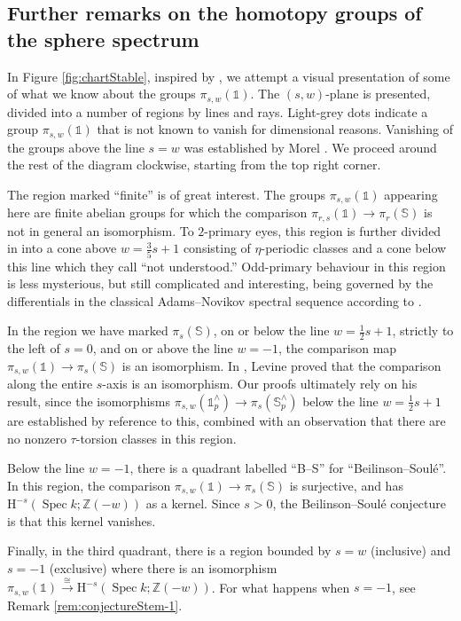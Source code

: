 \documentclass[11pt, oneside, dvipsnames, svgnames, table, final]{amsart}
\newcommand{\mathbx}[1]{\mathbb{#1}}
\theoremstyle{plain}
\theoremstyle{definition}
\theoremstyle{remark}
\newcommand{\Z}{\mathbx{Z}}
\newcommand{\spec}{\operatorname{Spec}}
\newcommand{\Spec}{\spec}
\newcommand{\Hoh}{\mathrm{H}}
\newcommand{\isom}{\cong}
\newcommand{\mto}[1]{\stackrel{#1}{\longrightarrow}}
\newcommand{\isomto}{\mto{\isom}}
\newcommand{\<}[1]{{\langle}#1 {\rangle}}
\newcommand{\one}{\mathbb{1}}
\newcommand{\SpS}{\mathbb{S}}
\begin{document}
\subsection{Further remarks on the homotopy groups of the sphere spectrum}
\label{sec:furth-remarks-homot}


In Figure \ref{fig:chartStable}, inspired by \cite[Fig.~1]{Gheorghe2017}, we attempt a visual presentation of some of what we know about the groups $\pi_{s,w}(\one)$. The $(s,w)$-plane is presented, divided into a number of regions by lines and rays. Light-grey dots indicate a group $\pi_{s,w}(\one)$ that is not known to vanish for dimensional reasons. Vanishing of the groups above the line $s=w$ was established by Morel \cite[Thm.~6.1.8]{Morel2005}. We proceed around the rest of the diagram clockwise, starting from the top right corner.

The region marked ``finite'' is of great interest. The groups $\pi_{s,w}(\one)$ appearing here are finite abelian groups for which the comparison $\pi_{r,s}(\one) \to \pi_r(\SpS)$ is not in general an isomorphism. To $2$-primary eyes, this region is further divided in \cite[Fig.~1]{Gheorghe2017} into a cone above $w=\frac{3}{5}s+1$ consisting of $\eta$-periodic classes and a cone below this line which they call ``not understood.'' Odd-primary behaviour in this region is less mysterious, but still complicated and interesting, being governed by the differentials in the classical Adams--Novikov spectral sequence according to \cite[Prop.~2.4.8]{Stahn2018}.

In the region we have marked $\pi_s(\SpS)$, on or below the line $w=\frac{1}{2}s+1$, strictly to the left of $s=0$, and on or above the line $w=-1$, the comparison map $\pi_{s,w}(\one) \to \pi_s(\SpS)$ is an isomorphism. In \cite{Levine2014}, Levine proved that the comparison along the entire $s$-axis is an isomorphism. Our proofs ultimately rely on his result, since the isomorphisms $\pi_{s,w}(\one^{\wedge}_p) \to \pi_s(\SpS^\wedge_p)$ below the line $w = \frac{1}{2}s+1$ are established by reference to this, combined with an observation that there are no nonzero $\tau$-torsion classes in this region.

Below the line $w=-1$, there is a quadrant labelled ``B--S'' for ``Beilinson--Soulé''. In this region, the comparison $\pi_{s,w}(\one) \to \pi_s(\SpS)$ is surjective, and has $\Hoh^{-s}(\Spec k; \Z(-w))$ as a kernel. Since $s > 0$, the Beilinson--Soulé conjecture is that this kernel vanishes.

Finally, in the third quadrant, there is a region bounded by $s=w$ (inclusive) and $s=-1$ (exclusive) where there is an isomorphism $\pi_{s,w}(\one) \isomto \Hoh^{-s}(\Spec k; \Z(-w))$. For what happens when $s=-1$, see Remark \ref{rem:conjectureStem-1}.
\end{document}
